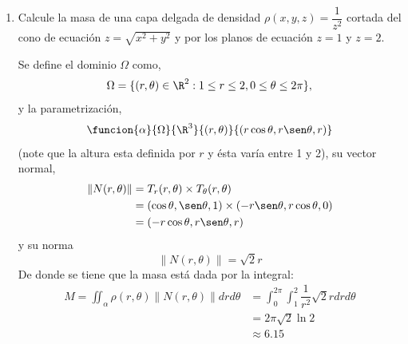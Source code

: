\documentclass[a4,11pt]{aleph-examen}
\begin{document}
\begin{preguntas}
\begin{respuesta}
\begin{respuesta}
\begin{respuesta}
\begin{enumerate}
\begin{respuesta}
    La distancia de cualquier punto de la superficie al eje $z$ es
    \[
        d(x,y)=\sqrt[]{x^2+y^2}
    \]
    entonces
    \[
        d^2(\theta,\phi)=a^2\sen^2 \phi.
    \]
    Finalmente el momento de inercia con respecto a cualquier diámetro $l$ es
    \begin{align*}
        I&=\iint_\gamma d^2 \frac{m}{A} dS\\
            &=\iint_\gamma d^2(\gamma) \frac{m}{A}||N(\theta,\phi)||d\phi d\theta 
    \end{align*}
    por lo tanto
    \begin{align*}
        I&=\frac{m}{A}\iint_\gamma a^2\sen^2 \phi a^2\sen \phi d\phi d\theta\\
            &=\frac{m}{4\pi a^2} \int_{0}^{2\pi} \int_{0}^{\pi} a^4 \sen^3 \phi d\phi d\theta\\ 
            &=\frac{2}{3}ma^2
    \end{align*}
\end{respuesta}


\item Calcule la masa de una capa delgada de densidad $\rho (x,y,z)=\dfrac{1}{z^2}$ cortada del cono de ecuación $z=\sqrt{x^2+y^2}$ y por los planos de ecuación $z=1$ y $z=2$.
\begin{respuesta}
    Se define el dominio $\Omega$ como,
    \[
    \Omega=\lbrace{(r,\theta)\in \R^2:1 \leq r \leq 2, 0 \leq \theta \leq 2 \pi\rbrace},
    \]
    y la parametrización,
    \[
    \funcion{\alpha}{\Omega}{\R^3}{(r,\theta)}{(r \cos \theta, r \sen \theta, r)}
    \]
    (note que la altura esta definida por $r$ y ésta varía entre 1 y 2), su vector normal,
    \[
    \begin{aligned}
    \|N(r,\theta)\|&=T_r(r,\theta) \times T_{\theta}(r,\theta)\\
    &=(\cos \theta, \sen \theta,1) \times (-r \sen \theta, r \cos \theta, 0)\\
    &=(- r \cos \theta,r \sen \theta, r)
    \end{aligned}
    \]
    y su norma
    \[
    \|N(r,\theta)\|=\sqrt{2}r
    \]
    De donde se tiene que la masa está dada por la integral:
    \[
    \begin{aligned}
    M=\iint_\alpha \rho(r,\theta) \|N(r,\theta)\| dr d\theta&=\int_{0}^{2 \pi} \int_{1}^{2} \dfrac{1}{r^2} \sqrt{2} r dr d\theta\\
    &=2 \pi \sqrt{2} \ln 2\\
    &\approx 6.15 
    \end{aligned}
    \]
\end{respuesta}


\end{enumerate}
\end{respuesta}
\end{respuesta}
\end{respuesta}
\end{preguntas}
\end{document}
